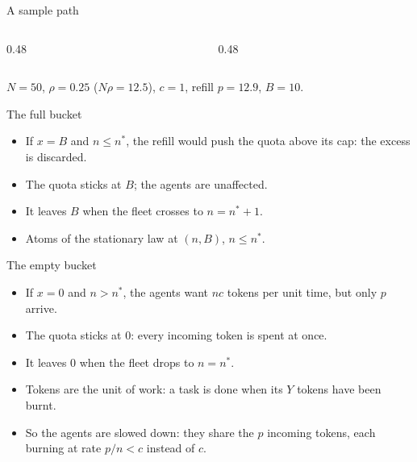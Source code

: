 \documentclass[aspectratio=169]{beamer}
\newcommand{\nb}{N\rho}
\newcommand{\ns}{n^*}
\newenvironment*{myitem}[1][1.5em]{\begin{itemize}\setlength{\itemsep}{#1}}{\end{itemize}}
\begin{document}
\begin{frame}{A sample path}

	\begin{columns}[T]
		\begin{column}{0.48\textwidth}
			
		\end{column}
		\begin{column}{0.48\textwidth}
			
		\end{column}
	\end{columns}

	\vfill
	\begin{center}
		{\footnotesize $N=50$, $\rho=0.25$ ($\nb=12.5$), $c=1$, refill $p=12.9$, $B=10$.}
	\end{center}
\end{frame}

\begin{frame}{The full bucket}

	\begin{myitem}
		\item If $x=B$ and $n\leq \ns$, the refill would push the quota above its cap: the excess is \alert{discarded}.
		\item The quota \alert{sticks} at $B$; the agents are \alert{unaffected}.
		\item It leaves $B$ when the fleet crosses to $n=\ns+1$.
		\item \alert{Atoms} of the stationary law at $(n,B)$, $n\leq\ns$.
	\end{myitem}
\end{frame}

\begin{frame}{The empty bucket}

	\begin{myitem}
		\item If $x=0$ and $n>\ns$, the agents want $nc$ tokens per unit time, but only $p$ arrive.
		\item The quota \alert{sticks} at $0$: every incoming token is spent at once.
		\item It leaves $0$ when the fleet drops to $n=\ns$.
		\item \alert{Tokens are the unit of work}: a task is done when its $Y$ tokens have been burnt.
		\pause
		\item So the agents are \alert{slowed down}: they share the $p$ incoming tokens, each burning at rate $p/n<c$ instead of $c$.
	\end{myitem}
\end{frame}
\end{document}
